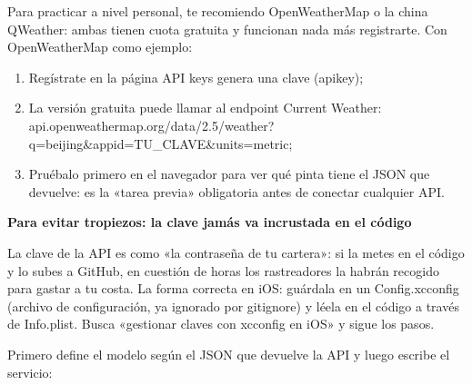 


Para practicar a nivel personal, te recomiendo OpenWeatherMap o la china QWeather: ambas tienen cuota gratuita y funcionan nada más registrarte. Con OpenWeatherMap como ejemplo:

\begin{enumerate}
  \item Regístrate en la página API keys genera una clave (apikey);
  \item La versión gratuita puede llamar al endpoint Current Weather: api.openweathermap.org/data/2.5/weather? q=beijing\&appid=TU\_CLAVE\&units=metric;
  \item Pruébalo primero en el navegador para ver qué pinta tiene el JSON que devuelve: es la «tarea previa» obligatoria antes de conectar cualquier API.
\end{enumerate}

\textbf{Para evitar tropiezos: la clave jamás va incrustada en el código}\par

La clave de la API es como «la contraseña de tu cartera»: si la metes en el código y lo subes a GitHub, en cuestión de horas los rastreadores la habrán recogido para gastar a tu costa. La forma correcta en iOS: guárdala en un Config.xcconfig (archivo de configuración, ya ignorado por gitignore) y léela en el código a través de Info.plist. Busca «gestionar claves con xcconfig en iOS» y sigue los pasos.


Primero define el modelo según el JSON que devuelve la API y luego escribe el servicio:

